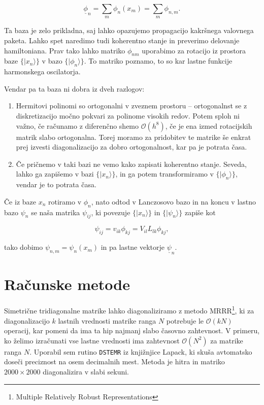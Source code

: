 \documentclass[a4 paper, 12pt]{article}
\begin{document}
\[
	\underline{\phi}_n = \sum_m \phi_n(x_m) = \sum_m \phi_{n,m}.
\]

Ta baza je zelo prikladna, saj lahko opazujemo propagacijo kakršnega valovnega paketa. Lahko spet naredimo tudi koherentno stanje
in preverimo delovanje hamiltoniana. Prav tako lahko matriko $\phi_{nm}$ uporabimo za rotacijo iz prostora baze 
$\big\{|x_n\rangle\big\}$ v bazo $\big\{|\phi_n\rangle\big\}$. To matriko poznamo, to so kar lastne funkcije harmonskega
oscilatorja.

Vendar pa ta baza ni dobra iz dveh razlogov:
\begin{enumerate}
	\item{Hermitovi polinomi so ortogonalni v zveznem prostoru -- ortogonalnst se z diskretizacijo močno pokvari za polinome
		visokih redov. Potem sploh ni važno, če računamo z diferenčno shemo $\mathcal{O}(h^8)$, če je ena izmed rotacijskih
		matrik slabo ortogonalna. Torej moramo za pridobitev te matrike še enkrat prej izvesti diagonalizacijo za dobro
		ortogonalnost, kar pa je potrata časa.}
	\item{Če pričnemo v taki bazi ne vemo kako zapisati koherentno stanje. Seveda, lahko ga zapišemo v bazi $\big\{|x_n\rangle\big\}$,
		in ga potem transformiramo v $\big\{|\phi_n\rangle\big\}$, vendar je to potrata časa.}
\end{enumerate}

Če iz baze $x_n$ rotiramo v $\phi_n$, nato odtod v Lanczosovo bazo in na koncu v lastno bazo $\psi_n$ se naša matrika $\psi_{ij}$, ki
povezuje $\big\{|x_n\rangle\big\}$ in $\big\{|\psi_n\rangle\big\}$ zapiše kot

\[
	\psi_{ij} = v_{ik} \phi_{kj} = V_{il} L_{lk} \phi_{kj},
\]

tako dobimo $\psi_{n,m} = \psi_n (x_m)$ in pa lastne vektorje $\underline{\psi}_n$.

\section{Računske metode}

Simetrične tridiagonalne matrike lahko diagonaliziramo z metodo MRRR\footnote{Multiple Relatively Robust Representations}, ki za
diagonalizacijo $k$ lastnih vrednosti matrike ranga $N$ potrebuje le $\mathcal{O} (kN)$ operacij, kar pomeni da ima ta hip
najmanj slabo časovno zahtevnost. V primeru, ko želimo izračunati vse lastne vrednosti ima zahtevnost $\mathcal{O}(N^2)$ za
matrike ranga $N$. Uporabil sem rutino {\tt DSTEMR} iz knjižnjice {\sc Lapack}, ki skuša avtomatsko doseči preciznost na
osem decimalnih mest. Metoda je hitra in matriko $2000\times2000$ diagonalizira v slabi sekuni.
\end{document}
